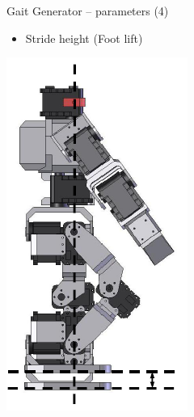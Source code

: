 \documentclass[compress]{beamer}
\begin{document}
\begin{frame}{Gait Generator -- parameters (4)}

    \begin{itemize}

        \item Stride height (Foot lift)
    \end{itemize}
    \begin{center}
        \includegraphics[height=0.5\paperheight]{bioloid-gait-4}
    \end{center}

\end{frame}
\end{document}
